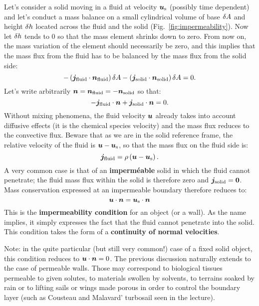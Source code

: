 Let's consider a solid moving in a fluid at velocity $\bu_\text s$ (possibly time dependent) and let's conduct a mass balance on a small cylindrical volume of base $\delta A$ and height $\delta h$ located across the fluid and the solid (Fig.~\ref{fig:impermeability}). Now let $\delta h$ tends to 0 so that the mass element shrinks down to zero.  From now on, the mass variation of the element should necessarily be zero, and this implies that the mass flux from the fluid has to be balanced by the mass flux from the solid side:
\begin{equation}
-\lp\bj_\text{fluid}\cdot \bn_\text{fluid}\rp \delA -  \lp\bj_\text{solid}\cdot \bn_\text{solid}\rp \delA = 0.
\end{equation}
Let's write arbitrarily $\bn = \bn_\text{fluid} = - \bn_\text{solid}$ so that:
\begin{equation}
-\bj_\text{fluid}\cdot \bn +  \bj_\text{solid}\cdot \bn = 0.
\end{equation}
Without mixing phenomena, the fluid velocity $\bu$ already takes into account diffusive effects (it is the chemical species velocity) and the mass flux reduces to the convective flux. Beware that as we are in the solid reference frame, the relative velocity of the fluid is $\bu - \bu_\text s$, so that the mass flux on the fluid side is:
\begin{equation}
\bj_\text{fluid} = \rho \lp\bu-\bu_\text s\rp.
\end{equation}
 A very common case is that of an \textbf{imperméable} solid in which the fluid cannot penetrate; the fluid mass flux within the solid is therefore zero and $\bj_\text{solid} = \boldsymbol 0$. Mass conservation expressed at an impermeable boundary therefore reduces to:
\begin{equation}
\bu\cdot\bn = \bu_\text s \cdot\bn
\label{eq:impermeability}
\end{equation}
This is the \textbf{impermeability condition} for an object (or a wall). As the name implies, it simply expresses the fact that the fluid cannot penetrate into the solid. This condition takes the form of a \textbf{continuity of normal velocities}.

Note: in the quite particular (but still very common!) case of a fixed solid object, this condition reduces to $\bu\cdot\bn =0$.
 The previous discussion naturally extends to the case of permeable walls. Those may correspond to biological tissues permeable to given solutes, to materials swollen by solvents, to terrains soaked by rain or to lifting sails or wings made porous in order to control the boundary layer (such as Cousteau and Malavard' turbosail seen in the lecture).

